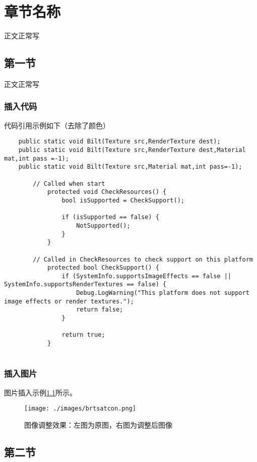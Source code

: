 \documentclass[utf8,a4paper]{book}
\begin{document}
   
\setmainfont{Times New Roman}  
\setcounter{tocdepth}{4}
\setcounter{secnumdepth}{4}
\renewcommand\arraystretch{1.2}
\renewcommand{\figurename}{图}
\renewcommand{\captionlabeldelim}{}

\chapter{章节名称}

正文正常写

\section{第一节}

正文正常写

\subsection{插入代码}

代码引用示例如下（去除了颜色）

\begin{lstlisting}
    public static void Bilt(Texture src,RenderTexture dest);
    public static void Bilt(Texture src,RenderTexture dest,Material mat,int pass =-1);
    public static void Bilt(Texture src,Material mat,int pass=-1);
    
        // Called when start
            protected void CheckResources() {
                bool isSupported = CheckSupport();
        
                if (isSupported == false) {
                    NotSupported();
                }
            }
        
        // Called in CheckResources to check support on this platform
            protected bool CheckSupport() {
                if (SystemInfo.supportsImageEffects == false || SystemInfo.supportsRenderTextures == false) {
                    Debug.LogWarning("This platform does not support image effects or render textures.");
                    return false;
                }
        
                return true;
            }


\end{lstlisting}

\subsection{插入图片}

图片插入示例\ref{brtsatcon}所示。
    \begin{figure}[htbp]
        \centering
        \texttt{[image: ./images/brtsatcon.png]}%
        \caption{图像调整效果：左图为原图，右图为调整后图像}
        \label {brtsatcon}
    \end{figure}

\section{第二节}
\end{document}
